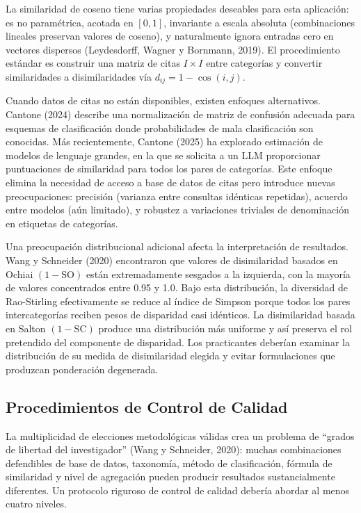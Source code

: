 \documentclass[
]{article}
\begin{document}
La similaridad de coseno tiene varias propiedades deseables para esta
aplicación: es no paramétrica, acotada en \([0,1]\), invariante a escala
absoluta (combinaciones lineales preservan valores de coseno), y
naturalmente ignora entradas cero en vectores dispersos (Leydesdorff,
Wagner y Bornmann, 2019). El procedimiento estándar es construir una
matriz de citas \(I \times I\) entre categorías y convertir
similaridades a disimilaridades vía \(d_{ij} = 1 - \cos(i,j)\).

Cuando datos de citas no están disponibles, existen enfoques
alternativos. Cantone (2024) describe una normalización de matriz de
confusión adecuada para esquemas de clasificación donde probabilidades
de mala clasificación son conocidas. Más recientemente, Cantone (2025)
ha explorado estimación de modelos de lenguaje grandes, en la que se
solicita a un LLM proporcionar puntuaciones de similaridad para todos
los pares de categorías. Este enfoque elimina la necesidad de acceso a
base de datos de citas pero introduce nuevas preocupaciones: precisión
(varianza entre consultas idénticas repetidas), acuerdo entre modelos
(aún limitado), y robustez a variaciones triviales de denominación en
etiquetas de categorías.

Una preocupación distribucional adicional afecta la interpretación de
resultados. Wang y Schneider (2020) encontraron que valores de
disimilaridad basados en Ochiai \((1 - \text{SO})\) están extremadamente
sesgados a la izquierda, con la mayoría de valores concentrados entre
0.95 y 1.0. Bajo esta distribución, la diversidad de Rao-Stirling
efectivamente se reduce al índice de Simpson porque todos los pares
intercategorías reciben pesos de disparidad casi idénticos. La
disimilaridad basada en Salton \((1 - \text{SC})\) produce una
distribución más uniforme y así preserva el rol pretendido del
componente de disparidad. Los practicantes deberían examinar la
distribución de su medida de disimilaridad elegida y evitar
formulaciones que produzcan ponderación degenerada.

\hypertarget{procedimientos-de-control-de-calidad}{%
\subsection{Procedimientos de Control de
Calidad}\label{procedimientos-de-control-de-calidad}}

La multiplicidad de elecciones metodológicas válidas crea un problema de
``grados de libertad del investigador'' (Wang y Schneider, 2020): muchas
combinaciones defendibles de base de datos, taxonomía, método de
clasificación, fórmula de similaridad y nivel de agregación pueden
producir resultados sustancialmente diferentes. Un protocolo riguroso de
control de calidad debería abordar al menos cuatro niveles.
\end{document}
